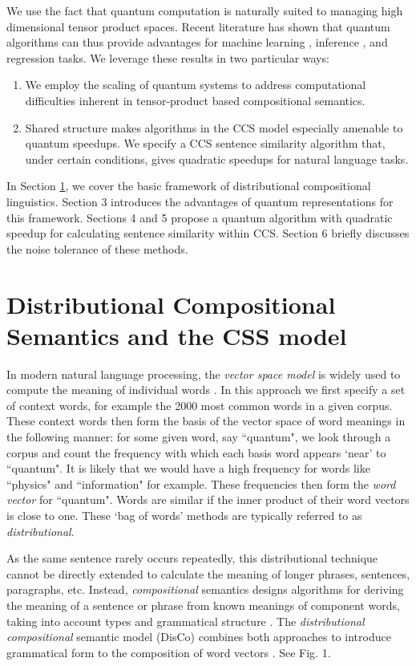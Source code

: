 We use the fact that quantum computation is naturally suited to managing high dimensional tensor product spaces. Recent literature has shown that quantum algorithms can thus provide advantages for machine learning \cite{wiebe2014quantum,rebentrost2014quantum}, inference \cite{low2014quantum}, and regression \cite{wiebe2012quantum,wang2014quantum} tasks.  We leverage these results in two particular ways:
\begin{enumerate}
\item We employ the scaling of quantum systems to address computational difficulties  inherent in tensor-product based compositional semantics.
\item Shared structure makes algorithms in the CCS model especially amenable to quantum speedups.  We specify a CCS sentence similarity algorithm that, under certain conditions, gives quadratic speedups for natural language tasks.
\end{enumerate}

In Section \ref{sec:disco}, we cover the basic framework of distributional compositional linguistics. Section 3 introduces the advantages of quantum representations for this framework.  Sections 4 and 5 propose a quantum algorithm with quadratic speedup for calculating sentence similarity within CCS. Section 6 briefly discusses the noise tolerance of these methods.

\section{Distributional Compositional Semantics and the CSS model}
\label{sec:disco}
In modern natural language processing, the \emph{vector space model} is widely used to compute the meaning of individual words \cite{schutze1998automatic}. In this approach we first specify a set of context words, for example the 2000 most common words in a given corpus.  These context words then form the basis of the vector space of word meanings in the following manner: for some given word, say  ``quantum", we look through a corpus and count the frequency with which each basis word    appears `near' to ``quantum". It is likely that we would have a high frequency for words like ``physics" and ``information" for example.  These frequencies then form the \emph{word vector} for ``quantum". Words are similar if the inner product of their word vectors is close to one. These `bag of words' methods are typically referred to as \emph{distributional}.

As the same sentence rarely occurs repeatedly, this distributional technique cannot be directly extended to calculate the meaning of longer phrases, sentences, paragraphs, etc. Instead, \emph{compositional} semantics designs algorithms for deriving the meaning of a sentence or phrase from known meanings of component words,  taking into account types and grammatical structure \cite{lambek2008word}. The \emph{distributional compositional} semantic model (DisCo) combines both approaches to introduce grammatical form to the composition of word vectors \cite{clark2008compositional}. See Fig. 1. 


